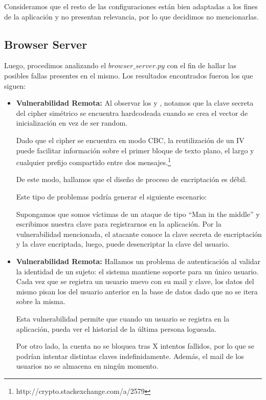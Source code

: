 \documentclass[10pt, a4paper]{article}
\begin{document}
Consideramos que el resto de las configuraciones están bien adaptadas a los fines de la aplicación y no presentan relevancia, por lo que decidimos no mencionarlas.

\newpage
\subsection{Browser Server}
Luego, procedimos analizando el $browser\_server.py$ con el fin de hallar las posibles fallas presentes en el mismo. Los resultados encontrados fueron los que siguen:

\begin{itemize}

\item \textbf{Vulnerabilidad Remota:} Al observar los  y , notamos que la clave secreta del cipher simétrico se encuentra hardcodeada cuando se crea el vector de inicialización en vez de ser random.

Dado que el cipher se encuentra en modo CBC, la reutilización de un IV puede facilitar información sobre el primer bloque de texto plano, el largo y cualquier prefijo compartido entre dos mensajes.\footnote{http://crypto.stackexchange.com/a/2579}

De este modo, hallamos que el diseño de proceso de encriptación es débil.

Este tipo de problemas podría generar el siguiente escenario:

Supongamos que somos víctimas de un ataque de tipo ``Man in the middle'' y escribimos nuestra clave para registrarnos en la aplicación. Por la vulnerabilidad mencionada, el atacante conoce la clave secreta de encriptación y la clave encriptada, luego, puede desencriptar la clave del usuario.

\item \textbf{Vulnerabilidad Remota:} Hallamos un problema de autenticación al validar la identidad de un sujeto: el sistema mantiene soporte para un único usuario. Cada vez que se registra un usuario nuevo con su mail y clave, los datos del mismo pisan los del usuario anterior en la base de datos dado que no se itera sobre la misma.

Esta vulnerabilidad permite que cuando un usuario se registra en la aplicación, pueda ver el historial de la última persona logueada.

Por otro lado, la cuenta no se bloquea tras X intentos fallidos, por lo que se podrían intentar distintas claves indefinidamente. Además, el mail de los usuarios no se almacena en ningún momento. 


\end{itemize}
\end{document}
